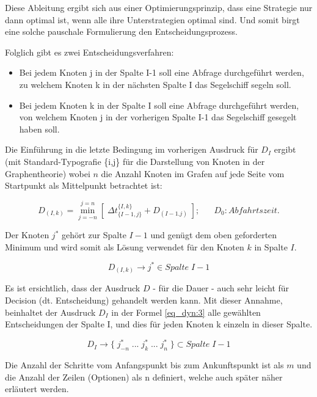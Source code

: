 \documentclass[a4paper,10pt]{article}
\begin{document}
Diese Ableitung ergibt sich aus einer Optimierungsprinzip, dass eine
Strategie nur dann optimal ist, wenn alle ihre Unterstrategien optimal
sind. Und somit birgt eine solche pauschale Formulierung den
Entscheidungsprozess. 
 
Folglich gibt es zwei Entscheidungsverfahren:

\begin{itemize}
\item Bei jedem Knoten j in der Spalte I-1 soll eine Abfrage durchgeführt
werden, zu welchem Knoten k in der nächsten Spalte I das Segelschiff segeln
soll.
\item Bei jedem Knoten k in der Spalte I soll eine Abfrage durchgeführt werden,
von welchem Knoten j in der vorherigen Spalte I-1 das Segelschiff gesegelt
haben soll.
\end{itemize}

Die Einführung in die letzte Bedingung im vorherigen Ausdruck für \(D_I\)
ergibt (mit Standard-Typografie \{i,j\}  für die Darstellung von Knoten in der
Graphentheorie) wobei $n$ die Anzahl Knoten im Grafen auf jede Seite vom
Startpunkt als Mittelpunkt betrachtet ist:

\begin{equation}
\label{eq_dyn:4}
D_{(I,k)} = \overset{j=n}{\underset{j=-n}{\min}} [\; \Delta t_{\{I-1,j\}}^{\{I,k\}} + D_{(I-1.j)} \;];\;\;\;\;\;\; D_0: Abfahrtszeit.
\end{equation}

Der Knoten $j^*$ gehört zur Spalte $I-1$ und genügt dem oben geforderten
Minimum und wird somit als Lösung verwendet für den Knoten $k$ in Spalte $I$.

\begin{equation}
\label{eq_dyn:5}
D_{(I,k)} \to j^* \in Spalte\; I-1
\end{equation}
 
Es ist ersichtlich, dass der Ausdruck \(D\) - für die Dauer - auch sehr leicht
für Decision (dt. Entscheidung) gehandelt werden kann. Mit dieser Annahme,
beinhaltet der Ausdruck \(D_I\) in der Formel \eqref{eq_dyn:3} alle gewählten
Entscheidungen der Spalte I, und dies für jeden Knoten k einzeln in dieser
Spalte.

\begin{equation}
\label{eq_dyn:6}
D_I \to \{\;j_{-n}^*\; ... \;j_{k}^* \;...\; j_{n}^*\;\} \subset Spalte\; I-1
\end{equation}

Die Anzahl der Schritte vom Anfangspunkt bis zum Ankunftspunkt ist als \(m\)
und die Anzahl der Zeilen (Optionen) als n definiert, welche auch später näher
erläutert werden.
 
\end{document}
